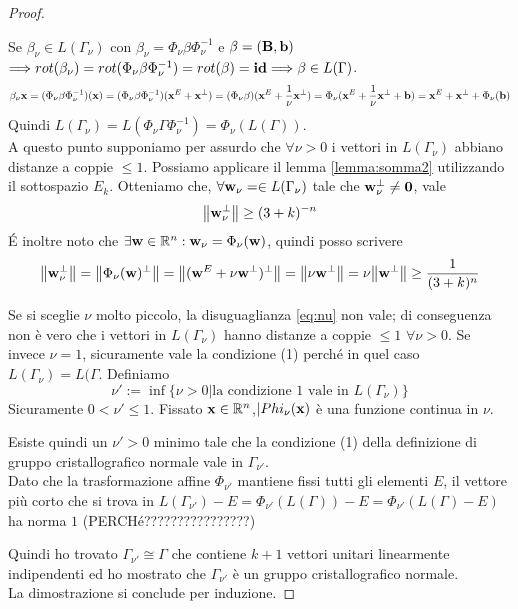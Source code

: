 \documentclass[a4paper]{book}
\begin{document}
\begin{proof}
\begin{itemize}
Se $\beta_{\nu} \in L(\Gamma_{\nu}) $ con  $ \beta_{\nu} = \Phi_{\nu} \beta \Phi_{\nu}^{-1}  $ e $\beta = (\vb{B, b}) $ $ \Longrightarrow rot(\beta_{\nu}) = rot(\Phi_{\nu} \beta \Phi_{\nu}^{-1}) = rot(\beta) = \vb{id}  \Longrightarrow \beta \in L(\Gamma)$. \\
\[\beta_{\nu} \vb{x} = (\Phi_{\nu} \beta \Phi_{\nu}^{-1})(\vb{x}) = (\Phi_{\nu} \beta \Phi_{\nu}^{-1})(\vb{x}^E + \vb{x}^{\perp}) =  
 (\Phi_{\nu} \beta)(\vb{x}^E + \frac{1}{\nu}\vb{x}^{\perp}) =  \Phi_{\nu}(\vb{x}^E + \frac{1}{\nu}\vb{x}^{\perp} + \vb{b}) = \vb{x}^E + \vb{x}^{\perp} + \Phi_{\nu}(\vb{b}) \] 
Quindi  $L(\Gamma_{\nu})  = L(\Phi_{\nu} \Gamma \Phi_{\nu}^{-1}) = \Phi_{\nu}(L(\Gamma))$. \\
A questo punto supponiamo per assurdo che $\forall \nu >0 $ i vettori in  $L(\Gamma_{\nu})$ abbiano distanze a coppie $\leq 1$. Possiamo applicare il lemma  \ref{lemma:somma2} utilizzando il sottospazio $E_k$. Otteniamo che, $\forall \vb{w}_{\nu} = \in L(\Gamma_{\nu})$ tale che $\vb{w}_{\nu}^{\perp} \neq \vb{0}$,  vale 
\[ \norm{\vb{w}_{\nu}^{\perp}} \geq (3 + k)^{-n}\]
\'E inoltre noto che $\exists \vb{w} \in \mathbb{R}^n : \vb{w}_{\nu} = \Phi_{\nu}(\vb{w})$, quindi posso scrivere
\begin{equation}
\label{eq:nu}
\norm{\vb{w}_{\nu}^{\perp}} = \norm{\Phi_{\nu}(\vb{w})^{\perp}} = \norm{ (\vb{w}^{E} + \nu \vb{w}^{\perp})^{\perp}} = \norm{\nu \vb{w}^{\perp}} = \nu \norm{\vb{w}^{\perp}}\geq \frac{1}{(3 + k)^{n}}
\end{equation}

Se si sceglie $\nu$ molto piccolo, la disuguaglianza \ref{eq:nu}  non vale; di conseguenza non è vero che i vettori in  $L(\Gamma_{\nu})$ hanno distanze a coppie $\leq 1$ $\forall \nu >0$. Se invece $\nu = 1 $, sicuramente vale la condizione (1) perché in quel caso $L(\Gamma_{\nu}) = L(\Gamma $. 
Definiamo 
\[ \nu' := \inf \{\nu >0 | \textrm{la condizione 1 vale in }  L(\Gamma_{\nu}) \} \]
Sicuramente $0 < \nu' \leq 1$. Fissato $\vb{x} \in \mathbb{R}^n$,$|Phi_{\nu}(\vb{x}) $ è una funzione continua in $\nu$. 





Esiste quindi un $\nu' > 0 $ minimo tale che la condizione (1) della definizione di gruppo cristallografico normale vale in $\Gamma_{\nu '}$.  \\
Dato che la trasformazione affine $\Phi_{\nu '}$ mantiene fissi tutti gli elementi $E$, il vettore più corto che si trova in $L(\Gamma_{\nu'}) - E  = \Phi_{\nu'}(L(\Gamma)) - E = \Phi_{\nu'}(L(\Gamma) - E)$ ha norma $1$ (PERCHé????????????????) \\
\end{itemize}
Quindi ho trovato  $\Gamma_{\nu'} \cong \Gamma$ che contiene $k+1$ vettori unitari linearmente indipendenti ed ho mostrato che $\Gamma_{\nu'}$ è un gruppo cristallografico normale.  \\
La dimostrazione si conclude per induzione. 
\end{proof}
\end{document}
